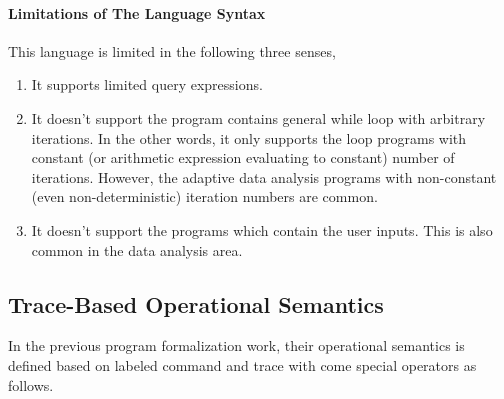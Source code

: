 \paragraph*{Limitations of The Language Syntax}
This language is limited in the following three senses,
\begin{enumerate}
\item  It supports limited query expressions.
%
\item  It doesn't support the program contains general while loop with arbitrary iterations.
In the other words, it only supports the loop programs with
constant (or arithmetic expression evaluating to constant) number of iterations.
However, the adaptive data analysis programs with non-constant (even non-deterministic) iteration numbers are common.
%
\item  It doesn't support the programs which contain the user inputs. This is also common in the data analysis area.
\end{enumerate}
%
\subsection*{Trace-Based Operational Semantics}
In the previous program formalization work, their operational semantics is defined based on labeled command and trace with come special operators as follows.

